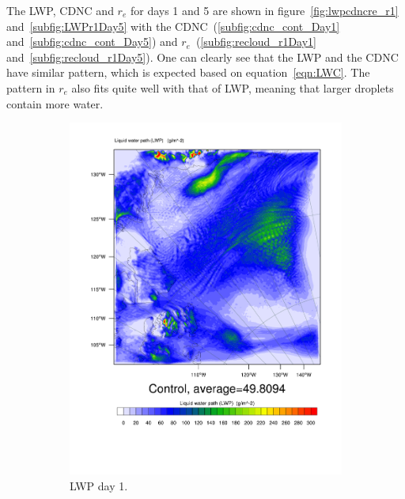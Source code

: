 The LWP, CDNC and $r_e$ for days 1 and 5 are shown in figure~\ref{fig:lwpcdncre_r1} and~\ref{subfig:LWPr1Day5} with the CDNC~(\ref{subfig:cdnc_cont_Day1} and~\ref{subfig:cdnc_cont_Day5}) and $r_e$~(\ref{subfig:recloud_r1Day1} and~\ref{subfig:recloud_r1Day5}). One can clearly see that the LWP and the CDNC have similar pattern, which is expected based on equation~\ref{eqn:LWC}. The pattern in $r_e$ also fits quite well with that of LWP, meaning that larger droplets contain more water.

\begin{figure}
    \centering
    \begin{subfigure}{0.40\textwidth}
        \centering
        \includegraphics[width=\textwidth]{results/control/LWP_Day1.pdf}
        \caption{LWP day 1.}
        \label{subfig:LWPr1Day1}
    \end{subfigure}
    \begin{subfigure}{0.40\textwidth}
        \centering

\end{subfigure}
\end{figure}
